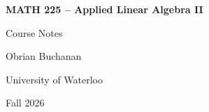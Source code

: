 \documentclass[11pt,letterpaper]{article}
\begin{document}
\begin{titlepage}
    \vspace*{\fill}
    \begin{center}
        {\Huge\bfseries MATH 225 -- Applied Linear Algebra II\par}
        \vspace{0.5cm}
        {\LARGE Course Notes\par}
        \vspace{0.3cm}
        {\Large Obrian Buchanan\par}
        \vspace{0.3cm}
        {\large University of Waterloo\par}
        \vspace{0.3cm}
        {\large Fall 2026\par}
    \end{center}
    \vspace*{\fill}
\end{titlepage}

\tableofcontents
\newpage


\newpage
\end{document}
